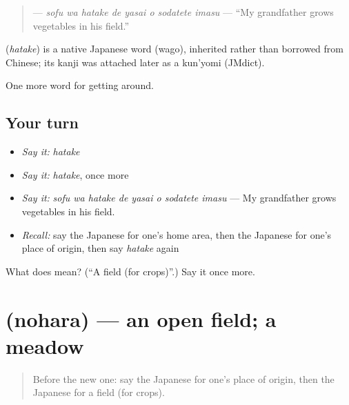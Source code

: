 \begin{quote}
\textbf{   } — \emph{sofu wa hatake de yasai o sodatete imasu} — \textquotedblleft{}My grandfather grows vegetables in his field.\textquotedblright{}
\end{quote}

\begin{cousinweb}
\textbf{} (\emph{hatake}) is a native Japanese word (wago), inherited rather than borrowed from Chinese; its kanji was attached later as a kun'yomi (JMdict).
\end{cousinweb}

\begin{grammarlens}[title={What you've built}]
One more word for getting around.
\end{grammarlens}

\subsection*{Your turn}
\begin{itemize}
\raggedright
  \item \emph{Say it:} \emph{hatake}
  \item \emph{Say it:} \emph{hatake}, once more
  \item \emph{Say it:} \emph{sofu wa hatake de yasai o sodatete imasu} — My grandfather grows vegetables in his field.
  \item \emph{Recall:} say the Japanese for one's home area, then the Japanese for one's place of origin, then say \emph{hatake} again
\end{itemize}

\begin{tcolorbox}[breakable,colback=teal!4,colframe=teal!35!black,title={Before you move on}]
What does  mean? (\textquotedblleft{}A field (for crops)\textquotedblright{}.) Say it once more.
\end{tcolorbox}
\section[\texorpdfstring{\ja{のはら} (nohara)}{のはら (nohara)}]{ (nohara) — an open field; a meadow}

\label{lesson:JA-C410-nohara}



\begin{quote}
Before the new one: say the Japanese for one's place of origin, then the Japanese for a field (for crops).
\end{quote}

